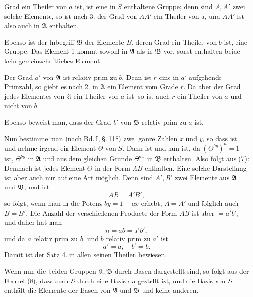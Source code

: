 Grad ein Theiler von $a$ ist, ist eine in $S$ enthaltene Gruppe; denn sind $A, A'$ zwei solche Elemente, so ist nach 3. der Grad von $AA'$ ein Theiler von $a$, und $AA'$ ist also auch in $\mathfrak{A}$ enthalten.

Ebenso ist der Inbegriff $\mathfrak{B}$ der Elemente $B$, deren Grad ein Theiler von $b$ ist, eine Gruppe. Das Element 1 kommt sowohl in $\mathfrak{A}$ als in $\mathfrak{B}$ vor, sonst enthalten beide kein gemeinschaftliches Element.

Der Grad $a'$ von $\mathfrak{A}$ ist relativ prim zu $b$. Denn ist $r$ eine in $a'$ aufgehende Primzahl, so giebt es nach 2. in $\mathfrak{A}$ ein Element vom Grade $r$. Da aber der Grad jedes Elementes von $\mathfrak{A}$ ein Theiler von $a$ ist, so ist auch $r$ ein Theiler von $a$ und nicht von $b$.

Ebenso beweist man, dass der Grad $b'$ von $\mathfrak{B}$ relativ prim zu $a$ ist.

Nun bestimme man (nach Bd.\,I, \S.\,118) zwei ganze Zahlen $x$ und $y$, so dass
ist, und nehme irgend ein Element $\Theta$ von $S$. Dann ist
und nun ist, da $(\Theta^{by})^a = 1$ ist, $\Theta^{by}$ in $\mathfrak{A}$ und aus dem gleichen Grunde $\Theta^{ax}$ in $\mathfrak{B}$ enthalten. Also folgt aus (7):
Demnach ist jedes Element $\Theta$ in der Form $AB$ enthalten. Eine solche Darstellung ist aber auch nur auf eine Art möglich. Denn sind $A', B'$ zwei Elemente aus $\mathfrak{A}$ und $\mathfrak{B}$, und ist
\[
AB = A'B',
\]
so folgt, wenn man in die Potenz $by = 1 - ax$ erhebt, $A = A'$ und folglich auch $B = B'$. Die Anzahl der verschiedenen Producte der Form $AB$ ist aber $= a'b'$, und daher hat man
\[
n = ab = a'b',
\]
und da $a$ relativ prim zu $b'$ und $b$ relativ prim zu $a'$ ist:
\[
a' = a,\quad b' = b.
\]
Damit ist der Satz 4. in allen seinen Theilen bewiesen.

Wenn nun die beiden Gruppen $\mathfrak{A}, \mathfrak{B}$ durch Basen dargestellt sind, so folgt aus der Formel (8), dass auch $S$ durch eine Basis dargestellt ist, und die Basis von $S$ enthält die Elemente der Basen von $\mathfrak{A}$ und $\mathfrak{B}$ und keine anderen.

